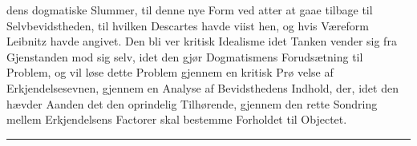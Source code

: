 \documentclass[12pt,a4paper]{book}
\newcommand{\divrule}{\begin{center}\rule{2cm}{0.4pt}\end{center}}
\begin{document}
dens dogmatiske Slummer, til denne nye Form ved atter at
gaae tilbage til Selvbevidstheden, til hvilken Descartes havde
viist hen, og hvis Væreform Leibnitz havde angivet. Den bli\-%
ver kritisk Idealisme idet Tanken vender sig fra Gjenstanden
mod sig selv, idet den gjør Dogmatismens Forudsætning til
Problem, og vil løse dette Problem gjennem en kritisk Prø\-%
velse af Erkjendelsesevnen, gjennem en Analyse af Bevidsthedens
Indhold, der, idet den hævder Aanden det den oprindelig
Tilhørende, gjennem den rette Sondring mellem Erkjendelsens
Factorer skal bestemme Forholdet til Objectet.

\divrule
\end{document}
